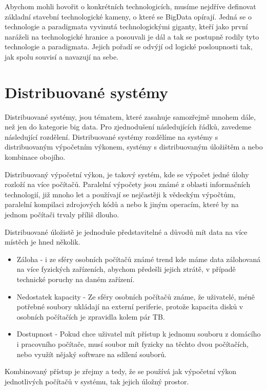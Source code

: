 

Abychom mohli hovořit o konkrétních technologicích, musíme nejdříve definovat základní stavební technologické kameny, o které se BigData opírají. Jedná se o technologie a paradigmata vyvinutá technologickými giganty, kteří jako první naráželi na technologické hranice a posouvali je dál a tak se postupně rodily tyto technologie a paradigmata. Jejich pořadí se odvýjí od logické posloupnosti tak, jak spolu souvisí a navazují na sebe.    

\section{Distribuované systémy}
Distribuované systémy, jsou tématem, které zasahuje samozřejmě mnohem dále, než jen do kategorie big data. Pro zjednodušení následujících řádků, zavedeme následující rozdělení. Distribuované systémy rozdělíme na systémy s distribuovaným výpočetním výkonem, systémy s distribuovaným úložištěm a nebo kombinace obojího. 

Distribuovaný výpočetní výkon, je takový systém, kde se výpočet jedné úlohy rozloží na více počítačů. Paralelní výpočety jsou známé z oblasti informačních technologií, již mnoho let a používají se nejčastěji k vědeckým výpočtům, paralelní kompilaci zdrojových kódů a nebo k jiným operacím, které by na jednom počítači trvaly příliš dlouho. 

Distribuované úložistě je jednoduše představitelné a důvodů mít data na více místěch je hned několik.
\begin{itemize}
\item Záloha - i ze sféry osobních počítačů známé trend kde máme data zálohovaná na více fyzických zařízeních, abychom předešli jejich ztrátě, v případě technické poruchy na daném zařízení. 

\item Nedostatek kapacity - Ze sféry osobních počítačů známe, že uživatelé, méně potřebné soubory ukládají na externí periferie, protože kapacita disků v osobních počítačích je zpravidla kolem pár TB.

\item Dostupnost - Pokud chce uživatel mít přístup k jednomu souboru z domácího i pracovního počítače, musí soubor mít fyzicky na těchto dvou počítačích, nebo využít nějaký software na sdílení souborů. 

\end{itemize}

Kombinovaný přístup je zřejmy a tedy, že se používá jak výpočetní výkon jednotlivých počítačů v systému, tak jejich úložný prostor. 

